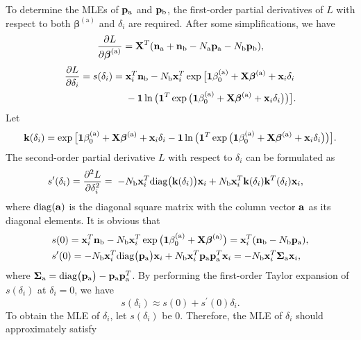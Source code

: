 To determine the MLEs of ${\bf p}_{\mathrm{a}}$ and ${\bf p}_{\mathrm{b}}$, the
first-order partial derivatives of $L$ with respect to both
$\bm\beta^{(\mathrm{a})}$ and $\delta_i$ are required. After some simplifications,
we have
\[
\frac{\partial L}{\partial\boldsymbol\beta^{(\mathrm{a})}}={\bf X}^T({\bf
n}_{\mathrm{a}}+{\bf n}_{\mathrm{b}}-N_{\mathrm{a}}{\bf
p}_{\mathrm{a}}-N_{\mathrm{b}}{\bf p}_{\mathrm{b}}),
\]
\begin{align*}
\frac{\partial L}{\partial\delta_i}=s(\delta_i)=&\;{\bf x}_i^T{\bf
n}_{\mathrm{b}}-N_{\mathrm{b}}{\bf x}_i^T\exp\big[\boldsymbol{1}\beta^{(\mathrm{a})}_0+{\bf X}\boldsymbol\beta^{(\mathrm{a})}+{\bf x}_i\delta_i\\
&\;-\boldsymbol{1}\ln\big(\boldsymbol{1}^T\exp\big(\boldsymbol{1}\beta^{(\mathrm{a})}_0 +{\bf
X}\boldsymbol\beta^{(\mathrm{a})}+{\bf x}_i\delta_i\big)\big)\big].
\end{align*}
Let
\[
{\bf k}(\delta_i)=\exp\big[\boldsymbol{1}\beta^{(\mathrm{a})}_0+{\bf
X}\boldsymbol\beta^{(\mathrm{a})}+{\bf
x}_i\delta_i-\boldsymbol{1}\ln\big(\boldsymbol{1}^T\exp\big(\boldsymbol{1}\beta^{(\mathrm{a})}_0 +{\bf
X}\boldsymbol\beta^{(\mathrm{a})}+{\bf x}_i\delta_i\big)\big)\big].
\]
The second-order partial derivative $L$ with respect to $\delta_i$ can be formulated
as
\begin{align*}
s^{\prime}(\delta_i)=&\;\frac{\partial^2 L}{\partial\delta^2_i}
=\;-N_{\mathrm{b}}{\bf x}_i^T\mathrm{diag}\big({\bf k}(\delta_i)\big){\bf x}_i +
N_{\mathrm{b}}{\bf x}_i^T{\bf k}(\delta_i){\bf k}^T(\delta_i){\bf x}_i,
\end{align*}
where $\mathrm{diag}({\bf a})$ is the diagonal square matrix with the column vector ${\bf a}$
as its diagonal elements. It is obvious that
\begin{align*}
&s(0)={\bf x}_i^T{\bf n}_{\mathrm{b}}-N_{\mathrm{b}}{\bf x}_i^T
\exp\big(\boldsymbol{1}\beta^{(\mathrm{a})}_0+{\bf X}\boldsymbol\beta^{(\mathrm{a})}\big)={\bf
x}_i^T({\bf
n}_{\mathrm{b}}-N_{\mathrm{b}}{\bf p}_{\mathrm{a}}),\\
&s^{\prime}(0)=-N_{\mathrm{b}}{\bf x}_i^T\mathrm{diag}\big({\bf p}_{\mathrm{a}}\big){\bf x}_i+
N_{\mathrm{b}}{\bf x}_i^T{\bf p}_{\mathrm{a}}{\bf p}_{\mathrm{a}}^T{\bf
x}_i=-N_{\mathrm{b}}{\bf x}_i^T\boldsymbol{\Sigma}_{\mathrm{a}}{\bf x}_i,
\end{align*}
where $\boldsymbol\Sigma_{\mathrm{a}}=\mathrm{diag}\big({\bf p}_{\mathrm{a}}\big)-{\bf
p}_{\mathrm{a}}{\bf p}_{\mathrm{a}}^T$. By performing the first-order Taylor
expansion of $s(\delta_i)$ at $\delta_i=0$, we have
\[
s(\delta_i)\approx s(0)+s^{\prime}(0)\delta_i.
\]
To obtain the MLE of $\delta_i$, let $s(\delta_i)$ be 0. Therefore, the MLE of
$\delta_i$ should approximately satisfy
